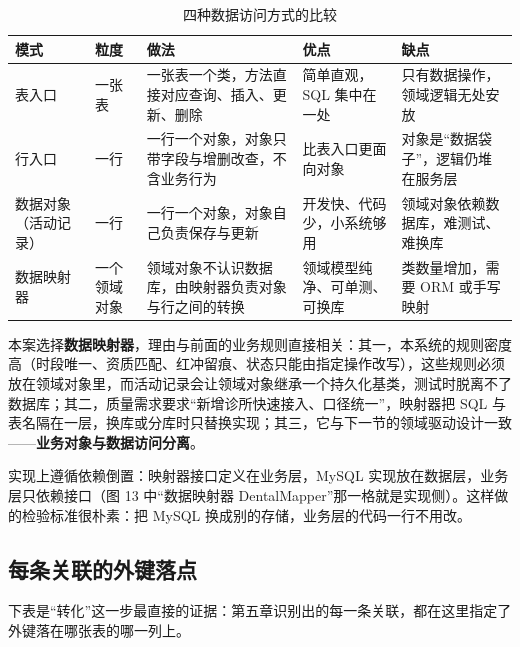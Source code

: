 \documentclass[11pt,a4paper]{ctexart}
\begin{document}
\begin{table}[H]
\centering
\caption{四种数据访问方式的比较}
{\small
\begin{tabularx}{\linewidth}{@{}L{2.6cm}L{1.7cm}L{4.4cm}L{3.2cm}X@{}}
\toprule
\textbf{\textcolor{adcblue!92}{模式}} & \textbf{\textcolor{adcblue!92}{粒度}} & \textbf{\textcolor{adcblue!92}{做法}} & \textbf{\textcolor{adcblue!92}{优点}} & \textbf{\textcolor{adcblue!92}{缺点}} \\
\midrule
表入口 & 一张表 & 一张表一个类，方法直接对应查询、插入、更新、删除 & 简单直观，SQL 集中在一处 & 只有数据操作，领域逻辑无处安放 \\
行入口 & 一行 & 一行一个对象，对象只带字段与增删改查，不含业务行为 & 比表入口更面向对象 & 对象是“数据袋子”，逻辑仍堆在服务层 \\
数据对象（活动记录） & 一行 & 一行一个对象，对象自己负责保存与更新 & 开发快、代码少，小系统够用 & 领域对象依赖数据库，难测试、难换库 \\
数据映射器 & 一个领域对象 & 领域对象不认识数据库，由映射器负责对象与行之间的转换 & 领域模型纯净、可单测、可换库 & 类数量增加，需要 ORM 或手写映射 \\
\end{tabularx}
}
\end{table}

本案选择\textbf{数据映射器}，理由与前面的业务规则直接相关：其一，本系统的规则密度高（时段唯一、资质匹配、红冲留痕、状态只能由指定操作改写），这些规则必须放在领域对象里，而活动记录会让领域对象继承一个持久化基类，测试时脱离不了数据库；其二，质量需求要求“新增诊所快速接入、口径统一”，映射器把 SQL 与表名隔在一层，换库或分库时只替换实现；其三，它与下一节的领域驱动设计一致——\textbf{业务对象与数据访问分离}。

实现上遵循依赖倒置：映射器接口定义在业务层，MySQL 实现放在数据层，业务层只依赖接口（图 13 中“数据映射器 DentalMapper”那一格就是实现侧）。这样做的检验标准很朴素：把 MySQL 换成别的存储，业务层的代码一行不用改。

\subsection{每条关联的外键落点}

下表是“转化”这一步最直接的证据：第五章识别出的每一条关联，都在这里指定了外键落在哪张表的哪一列上。
\end{document}
